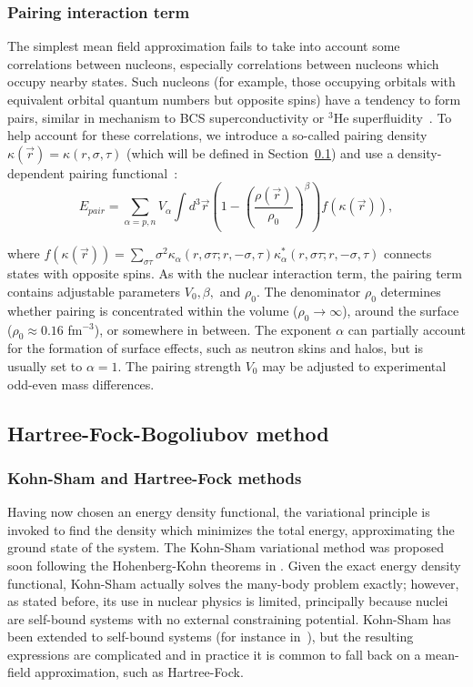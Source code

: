 \subsubsection{Pairing interaction term}
The simplest mean field approximation fails to take into account some correlations between nucleons, especially correlations between nucleons which occupy nearby states. Such nucleons (for example, those occupying orbitals with equivalent orbital quantum numbers but opposite spins) have a tendency to form pairs, similar in mechanism to BCS superconductivity or $^3$He superfluidity~\cite{brink2005}. To help account for these correlations, we introduce a so-called pairing density $\kappa(\vec{r})=\kappa(r,\sigma,\tau)$ (which will be defined in Section~\ref{sect:HFB}) and use a density-dependent pairing functional~\cite{chasman1976}:
\begin{equation}
E_{pair} = \sum_{\alpha=p,n} V_\alpha \int d^3\vec{r} \left( 1-\left(\frac{\rho(\vec{r})}{\rho_0}\right)^\beta \right)f\left(\kappa(\vec{r})\right),
\end{equation}

\noindent where $f\left(\kappa(\vec{r})\right) = \sum_{\sigma\tau}\sigma^2\kappa_\alpha(r,\sigma\tau;r,-\sigma,\tau)\kappa_\alpha^*(r,\sigma\tau;r,-\sigma,\tau)$ connects states with opposite spins. As with the nuclear interaction term, the pairing term contains adjustable parameters $V_0, \beta,$ and $\rho_0$. The denominator $\rho_0$ determines whether pairing is concentrated within the volume ($\rho_0\rightarrow\infty$), around the surface ($\rho_0\approx0.16$ fm$^{-3}$), or somewhere in between. The exponent $\alpha$ can partially account for the formation of surface effects, such as neutron skins and halos, but is usually set to $\alpha=1$. The pairing strength $V_0$ may be adjusted to experimental odd-even mass differences.

\subsection{Hartree-Fock-Bogoliubov method}\label{sect:HFB}
\subsubsection{Kohn-Sham and Hartree-Fock methods}

Having now chosen an energy density functional, the variational principle is invoked to find the density which minimizes the total energy, approximating the ground state of the system. The Kohn-Sham variational method was proposed soon following the Hohenberg-Kohn theorems in \cite{Kohn1965}. Given the exact energy density functional, Kohn-Sham actually solves the many-body problem exactly; however, as stated before, its use in nuclear physics is limited, principally because nuclei are self-bound systems with no external constraining potential. Kohn-Sham has been extended to self-bound systems (for instance in~\cite{engel2007,barnea2007,messud2009}), but the resulting expressions are complicated and in practice it is common to fall back on a mean-field approximation, such as Hartree-Fock.

